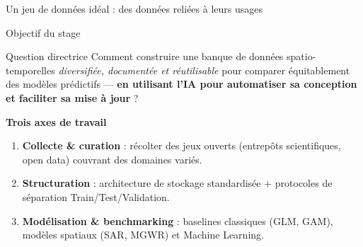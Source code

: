 \documentclass[aspectratio=169,11pt]{beamer}
\begin{document}
\begin{frame}{Un jeu de données idéal : des données reliées à leurs usages}
\end{frame}

\begin{frame}{Objectif du stage}
\small
\begin{block}{Question directrice}
Comment construire une banque de données spatio-temporelles \emph{diversifiée, documentée et réutilisable} pour comparer équitablement des modèles prédictifs --- \textbf{en utilisant l'IA pour automatiser sa conception et faciliter sa mise à jour} ?
\end{block}
\vspace{0.2cm}
\textbf{Trois axes de travail}
\begin{enumerate}
    \item \textbf{Collecte \& curation} : récolter des jeux ouverts (entrepôts scientifiques, open data) couvrant des domaines variés.
    \item \textbf{Structuration} : architecture de stockage standardisée + protocoles de séparation Train/Test/Validation.
    \item \textbf{Modélisation \& benchmarking} : baselines classiques (GLM, GAM), modèles spatiaux (SAR, MGWR) et Machine Learning.
\end{enumerate}
\end{frame}
\end{document}
